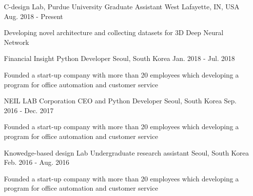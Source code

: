 


\begin{cventries}


\cventry
{C-design Lab, Purdue University} %
{Graduate Assistant} %
{West Lafayette, IN, USA} %
{Aug. 2018 - Present} %
{ %
\begin{cvitems}
\item {Developing novel architecture and collecting datasets for 3D Deep Neural Network}
\end{cvitems}
}

\cventry
{Financial Insight} %
{Python Developer} %
{Seoul, South Korea} %
{Jan. 2018 - Jul. 2018} %
{ %
\begin{cvitems}
\item {Founded a start-up company with more than 20 employees which developing a program for office automation and customer service}
\end{cvitems}
}

\cventry
{NEIL LAB Corporation} %
{CEO and Python Developer} %
{Seoul, South Korea} %
{Sep. 2016 - Dec. 2017} %
{ %
\begin{cvitems}
\item {Founded a start-up company with more than 20 employees which developing a program for office automation and customer service}
\end{cvitems}
}

\cventry
{Knowedge-based design Lab} %
{Undergraduate research assistant} %
{Seoul, South Korea} %
{Feb. 2016 - Aug. 2016} %
{ %
\begin{cvitems}
\item {Founded a start-up company with more than 20 employees which developing a program for office automation and customer service}
\end{cvitems}
}


\end{cventries}